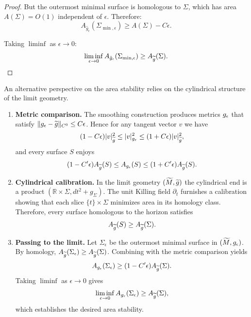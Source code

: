\begin{proof}
But the outermost minimal surface is homologous to $\Sigma$, which has area $A(\Sigma) = O(1)$ independent of $\epsilon$. Therefore:
\begin{equation}
    A_{\hat{g}_\epsilon}(\Sigma_{\min,\epsilon}) \ge A(\Sigma) - C\epsilon.
\end{equation}

Taking $\liminf$ as $\epsilon \to 0$:
\begin{equation}
    \liminf_{\epsilon \to 0} A_{\hat{g}_\epsilon}(\Sigma_{\min,\epsilon}) \ge A_{\widetilde{g}}(\Sigma).
\end{equation}
\end{proof}

\begin{remark}
An alternative perspective on the area stability relies on the cylindrical structure of the limit geometry.
\begin{enumerate}[1.]
    \item \textbf{Metric comparison.} The smoothing construction produces metrics $g_{\epsilon}$ that satisfy $\|g_{\epsilon}-\widetilde{g}\|_{C^0} \le C\epsilon$. Hence for any tangent vector $v$ we have
    \[
        (1-C\epsilon)|v|_{\widetilde{g}}^2 \le |v|_{g_{\epsilon}}^2 \le (1+C\epsilon)|v|_{\widetilde{g}}^2,
    \]
    and every surface $S$ enjoys
    \[
        (1-C'\epsilon)A_{\widetilde{g}}(S) \le A_{g_{\epsilon}}(S) \le (1+C'\epsilon)A_{\widetilde{g}}(S).
    \]
    \item \textbf{Cylindrical calibration.} In the limit geometry $(\widetilde{M},\widetilde{g})$ the cylindrical end is a product $(\mathbb{R}\times\Sigma, dt^2+g_\Sigma)$. The unit Killing field $\partial_t$ furnishes a calibration showing that each slice $\{t\}\times\Sigma$ minimizes area in its homology class. Therefore, every surface homologous to the horizon satisfies
    \[
        A_{\widetilde{g}}(S) \ge A_{\widetilde{g}}(\Sigma).
    \]
    \item \textbf{Passing to the limit.} Let $\Sigma_\epsilon$ be the outermost minimal surface in $(\widetilde{M},g_{\epsilon})$. By homology, $A_{\widetilde{g}}(\Sigma_\epsilon) \ge A_{\widetilde{g}}(\Sigma)$. Combining with the metric comparison yields
    \[
        A_{g_{\epsilon}}(\Sigma_\epsilon) \ge (1-C'\epsilon)A_{\widetilde{g}}(\Sigma).
    \]
    Taking $\liminf$ as $\epsilon\to 0$ gives
    \[
        \liminf_{\epsilon\to 0} A_{g_{\epsilon}}(\Sigma_\epsilon) \ge A_{\widetilde{g}}(\Sigma),
    \]
    which establishes the desired area stability.
\end{enumerate}
\end{remark}


